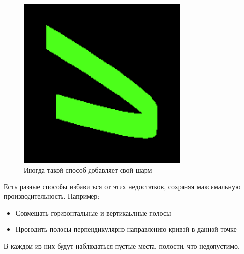 \documentclass[11pt]{article}
\begin{document}
    \begin{figure}
        \centering
        \includegraphics[width=0.75\textwidth]{one_stroke.png}
        \caption{Иногда такой способ добавляет свой шарм}
        \label{fig:pretty_vert_stroke}
    \end{figure}

    Есть разные способы избавиться от этих недостатков, сохраняя максимальную производительность.
    Например:
    \begin{itemize}
        \item Совмещать горизонтальные и вертикаьлные полосы
        \item Проводить полосы перпендикулярно направлению кривой в данной точке
    \end{itemize}
    В каждом из них будут наблюдаться пустые места, полости, что недопустимо.
\end{document}
